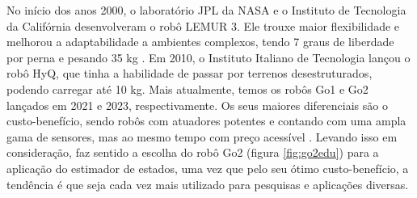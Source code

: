 No início dos anos 2000, o laboratório JPL da NASA e o Instituto de Tecnologia da Califórnia desenvolveram o robô LEMUR 3. Ele trouxe maior flexibilidade e melhorou a adaptabilidade a ambientes complexos, tendo 7 graus de liberdade por perna e pesando 35 kg \cite{parness2017lemur}. Em 2010, o Instituto Italiano de Tecnologia lançou o robô HyQ, que tinha a habilidade de passar por terrenos desestruturados, podendo carregar até 10 kg. Mais atualmente, temos os robôs Go1 e Go2 lançados em 2021 e 2023, respectivamente. Os seus maiores diferenciais são o custo-benefício, sendo robôs com atuadores potentes e contando com uma ampla gama de sensores, mas ao mesmo tempo com preço acessível \cite{unitree2026about}. Levando isso em consideração, faz sentido a escolha do robô Go2 (figura \ref{fig:go2edu}) para a aplicação do estimador de estados, uma vez que pelo seu ótimo custo-benefício, a tendência é que seja cada vez mais utilizado para pesquisas e aplicações diversas.



